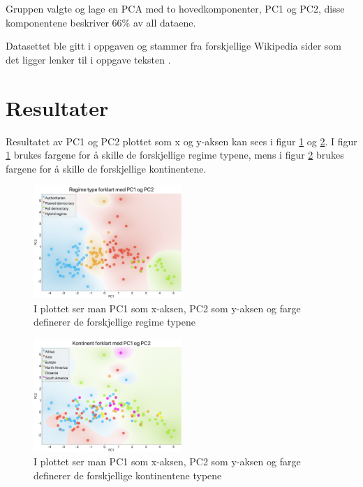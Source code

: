 \documentclass[twocolumn, 11pt]{article} %
\begin{document}
Gruppen valgte og lage en PCA med to hovedkomponenter, PC1 og PC2, disse komponentene beskriver 66\% av all dataene.

Datasettet ble gitt i oppgaven og stammer fra forskjellige Wikipedia sider som det ligger lenker til i oppgave teksten \cite{oppgavetekst}.  



\section{Resultater}

Resultatet av PC1 og PC2 plottet som x og y-aksen kan sees i figur \ref{PCA_Regimetype} og \ref{PCA_Kontinent}. I figur \ref{PCA_Regimetype} brukes fargene for å skille de forskjellige regime typene, mens i figur \ref{PCA_Kontinent} brukes fargene for å skille de forskjellige kontinentene.

\begin{figure}[H]
\includegraphics[width=0.5\textwidth]{images/PCA_Regimetype.png}
\caption{I plottet ser man PC1 som x-aksen, PC2 som y-aksen og farge definerer de forskjellige regime typene}
\label{PCA_Regimetype}
\end{figure}

\begin{figure}[H]
\includegraphics[width=0.5\textwidth]{images/PCA_Kontinent.png}
\caption{I plottet ser man PC1 som x-aksen, PC2 som y-aksen og farge definerer de forskjellige kontinentene typene}
\label{PCA_Kontinent}
\end{figure}
\end{document}
